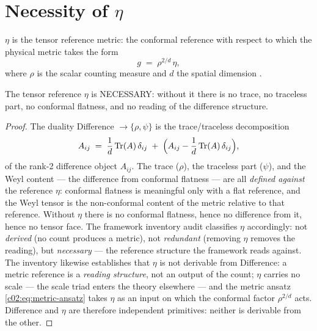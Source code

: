 \section{Necessity of \texorpdfstring{$\eta$}{eta}}
\label{c02:sec:eta-necessity}

\begin{definition}
\label{c02:def:eta}
\emph{$\eta$} is the tensor reference metric: the conformal reference with respect to which
the physical metric takes the form
\begin{equation}
\label{c02:eq:metric-ansatz}
g \;=\; \rho^{2/d}\,\eta,
\end{equation}
where $\rho$ is the scalar counting measure and $d$ the spatial dimension
\cite{c02:QG290,c02:QG285}.
\end{definition}

\begin{theorem}
\label{c02:thm:eta-necessary}
The tensor reference $\eta$ is NECESSARY: without it there is no trace, no traceless part,
no conformal flatness, and no reading of the difference structure.
\end{theorem}

\begin{proof}
The duality Difference $\to \{\rho,\psi\}$ is the trace/traceless decomposition
\cite{c02:QG286}
\begin{equation}
\label{c02:eq:decomposition}
A_{ij} \;=\; \frac{1}{d}\,\mathrm{Tr}(A)\,\delta_{ij}
\;+\;\Bigl(A_{ij}-\frac{1}{d}\,\mathrm{Tr}(A)\,\delta_{ij}\Bigr),
\end{equation}
of the rank-2 difference object $A_{ij}$. The trace ($\rho$), the traceless part ($\psi$),
and the Weyl content --- the difference from conformal flatness \cite{c02:QG285} --- are all
\emph{defined against} the reference $\eta$: conformal flatness is meaningful only with a
flat reference, and the Weyl tensor is the non-conformal content of the metric relative to
that reference. Without $\eta$ there is no conformal flatness, hence no difference from it,
hence no tensor face. The framework inventory audit \cite{c02:QG291} classifies $\eta$
accordingly: not \emph{derived} (no count produces a metric), not \emph{redundant} (removing
$\eta$ removes the reading), but \emph{necessary} --- the reference structure the framework
reads against. The inventory likewise establishes that $\eta$ is not derivable from
Difference: a metric reference is a \emph{reading structure}, not an output of the count;
$\eta$ carries no scale --- the scale triad enters the theory elsewhere --- and the metric
ansatz \eqref{c02:eq:metric-ansatz} takes $\eta$ as an input on which the conformal factor
$\rho^{2/d}$ acts. Difference and $\eta$ are therefore independent primitives: neither is
derivable from the other.
\end{proof}

